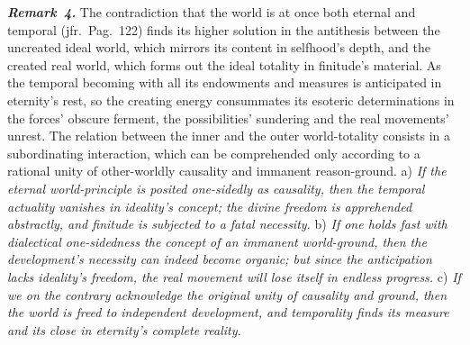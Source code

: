 \documentclass[12pt]{book}
\newcommand{\anm}[1]{\emph{\textbf{Remark~#1.}}}
\begin{document}
\anm{4} The contradiction that the world is at once both eternal and
temporal (jfr.\ Pag.\ 122) finds its higher solution in the antithesis
between the uncreated ideal world, which mirrors its content in selfhood's
depth, and the created real world, which forms out the ideal totality in
finitude's material. As the temporal becoming with all its endowments and
measures is anticipated in eternity's rest, so the creating energy
consummates its esoteric determinations in the forces' obscure ferment, the
possibilities' sundering and the real movements' unrest. The relation
between the inner and the outer world-totality consists in a subordinating
interaction, which can be comprehended only according to a rational unity of
other-worldly causality and immanent reason-ground. a) \emph{If the eternal
world-principle is posited one-sidedly as causality, then the temporal
actuality vanishes in ideality's concept; the divine freedom is apprehended
abstractly, and finitude is subjected to a fatal necessity.} b) \emph{If one
holds fast with dialectical one-sidedness the concept of an immanent
world-ground, then the development's necessity can indeed become organic;
but since the anticipation lacks ideality's freedom, the real movement will
lose itself in endless progress.} c) \emph{If we on the contrary acknowledge
the original unity of causality and ground, then the world is freed to
independent development, and temporality finds its measure and its close in
eternity's complete reality.}
\end{document}
